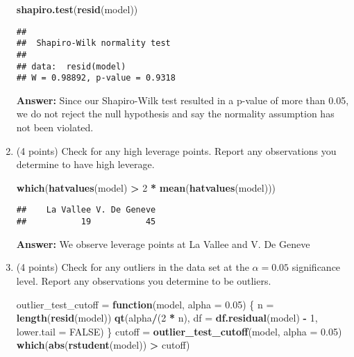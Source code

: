 \documentclass[
]{article}
\newenvironment{Shaded}{\begin{snugshade}}{\end{snugshade}}
\newcommand{\AttributeTok}[1]{\textcolor[rgb]{0.13,0.29,0.53}{#1}}
\newcommand{\ConstantTok}[1]{\textcolor[rgb]{0.56,0.35,0.01}{#1}}
\newcommand{\ControlFlowTok}[1]{\textcolor[rgb]{0.13,0.29,0.53}{\textbf{#1}}}
\newcommand{\DecValTok}[1]{\textcolor[rgb]{0.00,0.00,0.81}{#1}}
\newcommand{\FloatTok}[1]{\textcolor[rgb]{0.00,0.00,0.81}{#1}}
\newcommand{\FunctionTok}[1]{\textcolor[rgb]{0.13,0.29,0.53}{\textbf{#1}}}
\newcommand{\NormalTok}[1]{#1}
\newcommand{\OtherTok}[1]{\textcolor[rgb]{0.56,0.35,0.01}{#1}}
\newcommand{\SpecialCharTok}[1]{\textcolor[rgb]{0.81,0.36,0.00}{\textbf{#1}}}
\begin{document}
\begin{enumerate}
\begin{Shaded}
\begin{Highlighting}[]
\FunctionTok{shapiro.test}\NormalTok{(}\FunctionTok{resid}\NormalTok{(model))}
\end{Highlighting}
\end{Shaded}

\begin{verbatim}
## 
##  Shapiro-Wilk normality test
## 
## data:  resid(model)
## W = 0.98892, p-value = 0.9318
\end{verbatim}

  \textbf{Answer:} Since our Shapiro-Wilk test resulted in a p-value of
  more than 0.05, we do not reject the null hypothesis and say the
  normality assumption has not been violated.
\item
  (4 points) Check for any high leverage points. Report any observations
  you determine to have high leverage.

\begin{Shaded}
\begin{Highlighting}[]
\FunctionTok{which}\NormalTok{(}\FunctionTok{hatvalues}\NormalTok{(model) }\SpecialCharTok{\textgreater{}} \DecValTok{2} \SpecialCharTok{*} \FunctionTok{mean}\NormalTok{(}\FunctionTok{hatvalues}\NormalTok{(model)))}
\end{Highlighting}
\end{Shaded}

\begin{verbatim}
##    La Vallee V. De Geneve 
##           19           45
\end{verbatim}

  \textbf{Answer:} We observe leverage points at La Vallee and V. De
  Geneve
\item
  (4 points) Check for any outliers in the data set at the
  \(\alpha = 0.05\) significance level. Report any observations you
  determine to be outliers.

\begin{Shaded}
\begin{Highlighting}[]
\NormalTok{outlier\_test\_cutoff }\OtherTok{=} \ControlFlowTok{function}\NormalTok{(model, }\AttributeTok{alpha =} \FloatTok{0.05}\NormalTok{) \{}
\NormalTok{    n }\OtherTok{=} \FunctionTok{length}\NormalTok{(}\FunctionTok{resid}\NormalTok{(model))}
    \FunctionTok{qt}\NormalTok{(alpha}\SpecialCharTok{/}\NormalTok{(}\DecValTok{2} \SpecialCharTok{*}\NormalTok{ n), }\AttributeTok{df =} \FunctionTok{df.residual}\NormalTok{(model) }\SpecialCharTok{{-}} \DecValTok{1}\NormalTok{, }\AttributeTok{lower.tail =} \ConstantTok{FALSE}\NormalTok{)}
\NormalTok{\}}
\NormalTok{cutoff }\OtherTok{=} \FunctionTok{outlier\_test\_cutoff}\NormalTok{(model, }\AttributeTok{alpha =} \FloatTok{0.05}\NormalTok{)}
\FunctionTok{which}\NormalTok{(}\FunctionTok{abs}\NormalTok{(}\FunctionTok{rstudent}\NormalTok{(model)) }\SpecialCharTok{\textgreater{}}\NormalTok{ cutoff)}
\end{Highlighting}
\end{Shaded}


\end{enumerate}
\end{document}
